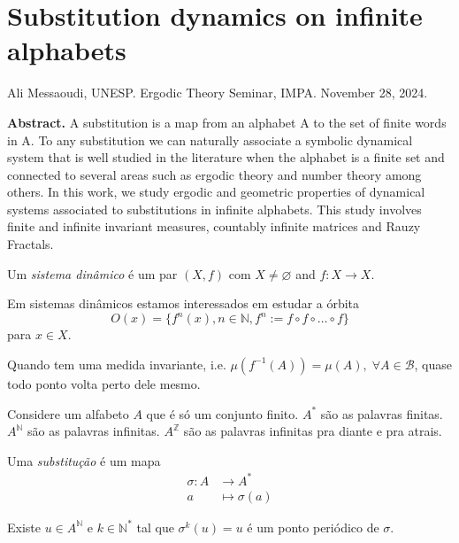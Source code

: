 \section{Substitution dynamics on infinite
alphabets}
\label{section-substitution-dynamics}

\noindent
Ali Messaoudi, UNESP.
Ergodic Theory Seminar, IMPA.
November 28, 2024.

\medskip\noindent
{\bf Abstract.}
A substitution is a map from an alphabet A to
the set of finite words in A. To any
substitution we can naturally associate a
symbolic dynamical system that is well
studied in the literature when the alphabet
is a finite set and connected to several
areas such as ergodic theory and number
theory among others.
In this work, we study ergodic and geometric
properties of dynamical systems associated to
substitutions in infinite alphabets. This
study involves finite and infinite invariant
measures, countably infinite matrices and
Rauzy Fractals.

\medskip{}

\begin{definition}
\label{definition-ms-dynamical-system}
Um \textit{sistema dinâmico} é um par
$(X,f)$ com  $X \neq  \varnothing$ and
$f:X\to X$.
\end{definition}

Em sistemas dinâmicos estamos interessados em
estudar a órbita
$$
O(x)=\{f^n(x), n \in \mathbb{N},
f^n:=f \circ f \circ\ldots \circ f\}
$$
para $x \in X$.

Quando tem uma medida invariante, i.e.
$\mu(f^{-1}(A))=\mu(A),\; \forall A \in
\mathcal{B}$,  quase todo ponto volta perto
dele mesmo.

\medskip{}
Considere um alfabeto $A$ que é só um
conjunto finito. $A^*$ são as palavras
finitas. $A^\mathbb{N}$ são as palavras
infinitas. $A^\mathbb{Z}$ são as palavras
infinitas pra diante e pra atrais.

Uma \textit{substitução} é um mapa
$$
\begin{aligned}
\sigma: A &\longrightarrow A^* \\
a &\longmapsto \sigma(a)
\end{aligned}
$$

\begin{lemma}
\label{lemma-ms-periodic}
Existe $u \in A^\mathbb{N}$ e
$k \in \mathbb{N}^*$ tal que
$\sigma^k(u)=u$ é um ponto periódico de
$\sigma$.
\end{lemma}

